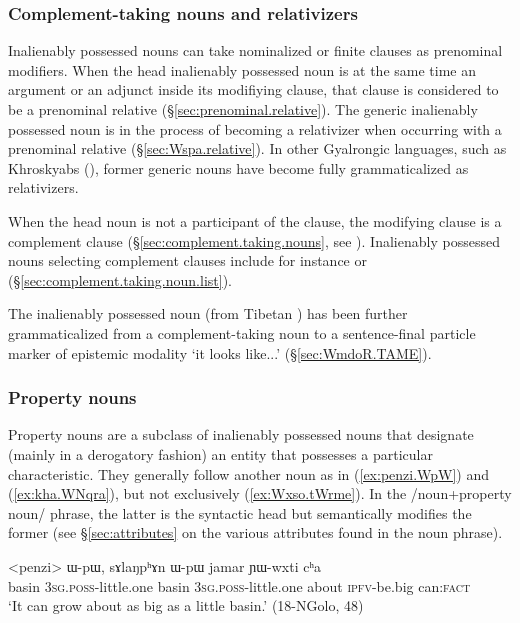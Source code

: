 \subsubsection{Complement-taking nouns and relativizers} \label{sec:complement.taking.IPN}
Inalienably possessed nouns can take nominalized or finite clauses as prenominal modifiers. When the head inalienably possessed noun is at the same time an argument or an adjunct inside its modifiying clause, that clause is considered to be a prenominal relative (§\ref{sec:prenominal.relative}). The generic inalienably possessed noun  is in the process of becoming a relativizer when occurring with a prenominal relative (§\ref{sec:Wspa.relative}). In other Gyalrongic languages, such as Khroskyabs (\citealt[519]{lai17khroskyabs}), former generic nouns have become fully grammaticalized as relativizers.

When the head noun is not a participant of the clause, the modifying clause is a complement clause (§\ref{sec:complement.taking.nouns}, see \citealt[239--241]{jacques16complementation}). Inalienably possessed nouns selecting complement clauses include for instance  or  (§\ref{sec:complement.taking.noun.list}). 

The inalienably possessed noun  (from Tibetan ) has been further grammaticalized from a complement-taking noun to a sentence-final particle marker of epistemic modality `it looks like...' (§\ref{sec:WmdoR.TAME}).

 
\subsubsection{Property nouns} \label{sec:property.nouns}
Property nouns are a subclass of inalienably possessed nouns that designate (mainly in a derogatory fashion) an entity that possesses a particular characteristic. They generally follow another noun as in (\ref{ex:penzi.WpW}) and (\ref{ex:kha.WNqra}), but not exclusively (\ref{ex:Wxso.tWrme}). In the /noun+property noun/ phrase, the latter is the syntactic head but semantically modifies the former (see §\ref{sec:attributes} on the various attributes found in the noun phrase).  

\begin{exe}
\ex \label{ex:penzi.WpW}
 \gll <penzi> ɯ-pɯ, sɤlaŋpʰɤn ɯ-pɯ jamar ɲɯ-wxti cʰa  \\
 basin \textsc{3sg}.\textsc{poss}-little.one   basin \textsc{3sg}.\textsc{poss}-little.one  about \textsc{ipfv}-be.big can:\textsc{fact} \\
 \glt `It can grow about as big as a little basin.' (18-NGolo, 48)
\end{exe}

